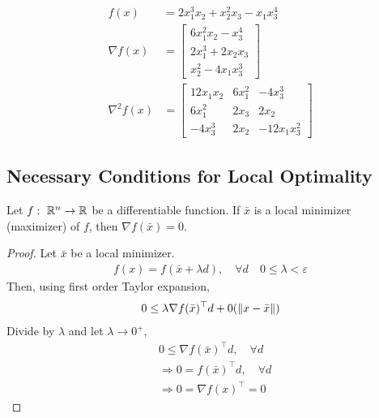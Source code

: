 \documentclass[11pt]{article}
\numberwithin{equation}{section}
\begin{document}
\begin{example}
    \begin{align*}
        f(x) &= 2 x_{1}^{3} x_{2}+x_{2}^{2} x_{3}-x_{1} x_{3}^{4} \\
        \nabla f(x) &= \left[\begin{array}{l}
            6 x_{1}^{2} x_{2}-x_{3}^{4} \\
            2 x_{1}^{3}+2 x_{2} x_{3} \\
            x_{2}^{2}-4 x_{1} x_{3}^{3}
            \end{array}\right] \\
            \nabla^2 f(x) &= \left[\begin{array}{ccc}
                12 x_{1} x_{2} & 6 x_{1}^{2} & -4 x_{3}^{3} \\
                6 x_{1}^{2} & 2 x_{3} & 2 x_{2} \\
                -4 x_{3}^{3} & 2 x_{2} & -12 x_{1} x_{3}^{2}
                \end{array}\right]
    \end{align*}
\end{example}

\subsection{Necessary Conditions for Local Optimality}
\begin{theorem}
    Let $f: \ \mathbb R^n \rightarrow \mathbb R$ be a differentiable function. If $\bar{x}$ is a local minimizer (maximizer) of $f$, then $\nabla f(\bar{x})=0$.
    \begin{proof}
        Let $\bar{x}$ be a local minimizer. \begin{align*}
            f(x)=f(\bar{x}+\lambda d), \quad \forall d \quad 0 \leq \lambda<\varepsilon
        \end{align*}
        Then, using first order Taylor expansion, \begin{align*}
            0 \leq \lambda \nabla f(\bar{x})^\top d + 0(\left\| x-\bar{x} \right\|)
        \end{align*}
        Divide by $\lambda $ and let $\lambda \rightarrow 0^+$, \begin{align*}
            & 0 \leq \nabla f(\bar{x})^{\top} d, \quad \forall d \\
            & \Rightarrow 0 = f(\bar{x})^{\top} d, \quad \forall d \\
            & \Rightarrow 0 = \nabla f(x)^{\top} = 0
        \end{align*}
    \end{proof}
\end{theorem}
\end{document}
